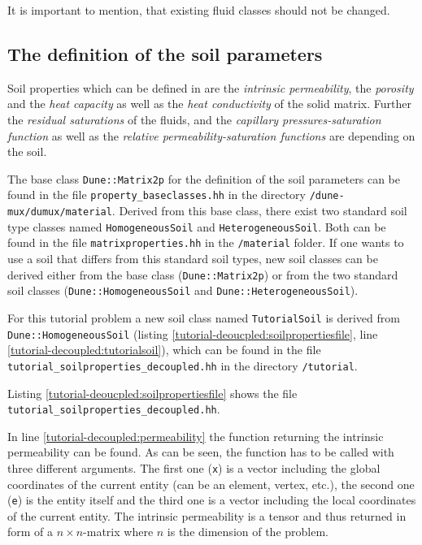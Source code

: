 It is important to mention, that existing fluid classes should not be changed.

\subsection{The definition of the soil parameters}\label{tutorial-decoupled:description-soil-class}

Soil properties which can be defined in \Dumux are the \textit{intrinsic permeability}, the \textit{porosity} and the \textit{heat capacity} as well as the \textit{heat conductivity} of the solid matrix. Further the \textit{residual saturations} of the fluids, and the \textit{capillary pressures-saturation function} as well as the \textit{relative permeability-saturation functions} are depending on the soil.

The base class \texttt{Dune::Matrix2p} for the definition of the soil parameters can be found in the file \texttt{property\_baseclasses.hh} in the directory \texttt{/dune-mux/dumux/material}. Derived from this base class, there exist two standard soil type classes named \texttt{HomogeneousSoil} and \texttt{HeterogeneousSoil}. Both can be found in the file \texttt{matrixproperties.hh} in the \texttt{/material} folder. If one wants to use a soil that differs from this standard soil types, new soil classes can be derived either from the base class (\texttt{Dune::Matrix2p}) or from the two standard soil classes (\texttt{Dune::HomogeneousSoil} and \texttt{Dune::HeterogeneousSoil}).

For this tutorial problem a new soil class named \texttt{TutorialSoil} is derived from \texttt{Dune::HomogeneousSoil} (listing \ref{tutorial-deoucpled:soilpropertiesfile}, line \ref{tutorial-decoupled:tutorialsoil}), which can be found in the file \texttt{tutorial\_soilproperties\_decoupled.hh} in the directory \texttt{/tutorial}.

Listing \ref{tutorial-deoucpled:soilpropertiesfile} shows the file \texttt{tutorial\_soilproperties\_decoupled.hh}.

\begin{lst}\label{tutorial-deoucpled:soilpropertiesfile} \mbox{}

\end{lst}

In line \ref{tutorial-decoupled:permeability} the function returning the intrinsic permeability can be found. As can be seen, the function has to be called with three different arguments. The first one (\texttt{x}) is a vector including the global coordinates of the current entity (can be an element, vertex, etc.), the second one (\texttt{e}) is the entity itself and the third one is a vector including the local coordinates of the current entity. The intrinsic permeability is a tensor and thus returned in form of a $n \times n$-matrix where $n$ is the dimension of the problem.


